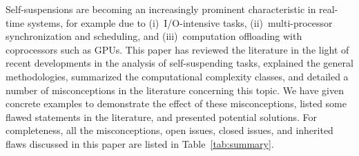  Self-suspensions are becoming an increasingly prominent
characteristic in real-time systems, for example due to (i)~I/O-intensive tasks,
(ii)~multi-processor synchronization and scheduling, and (iii)~computation
offloading with coprocessors such as GPUs.  This paper has reviewed the literature in the light of
recent developments in the analysis of self-suspending tasks,
explained the general methodologies, summarized the computational complexity classes, 
and detailed a number of 
misconceptions in the literature concerning this topic. We
have given concrete examples to demonstrate the effect of these
misconceptions, listed some flawed statements in the literature, and
presented potential solutions. 
For completeness, all the misconceptions, open issues, closed issues,
and inherited flaws discussed in this paper are listed in Table~\ref{tab:summary}.

